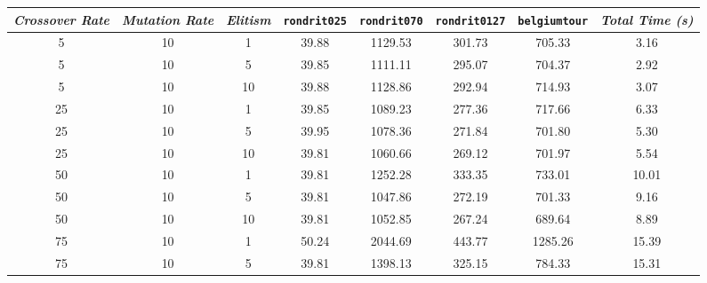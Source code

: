 

\begin{table}[H]
\centering
\footnotesize
{\renewcommand{\arraystretch}{1}}
\begin{tabular}{ccc|c|c|c|c|c}
\textit{Crossover Rate} & \textit{Mutation Rate} & \textit{Elitism} & \texttt{rondrit025} & \texttt{rondrit070} & \texttt{rondrit0127} & \texttt{belgiumtour} & \textit{Total Time (s)} \\\hline
5 & 10 & 1 & \cellcolor{gray!50}39.88 & \cellcolor{gray!1}1129.53 & \cellcolor{gray!1}301.73 & \cellcolor{gray!37}705.33 & 3.16\\
5 & 10 & 5 & \cellcolor{gray!50}39.85 & \cellcolor{gray!1}1111.11 & \cellcolor{gray!1}295.07 & \cellcolor{gray!37}704.37 & 2.92\\
5 & 10 & 10 & \cellcolor{gray!50}39.88 & \cellcolor{gray!1}1128.86 & \cellcolor{gray!1}292.94 & \cellcolor{gray!34}714.93 & 3.07\\
25 & 10 & 1 & \cellcolor{gray!50}39.85 & \cellcolor{gray!1}1089.23 & \cellcolor{gray!1}277.36 & \cellcolor{gray!33}717.66 & 6.33\\
25 & 10 & 5 & \cellcolor{gray!49}39.95 & \cellcolor{gray!1}1078.36 & \cellcolor{gray!1}271.84 & \cellcolor{gray!38}701.80 & 5.30\\
25 & 10 & 10 & \cellcolor{gray!50}39.81 & \cellcolor{gray!1}1060.66 & \cellcolor{gray!1}269.12 & \cellcolor{gray!38}701.97 & 5.54\\
50 & 10 & 1 & \cellcolor{gray!50}39.81 & \cellcolor{gray!1}1252.28 & \cellcolor{gray!1}333.35 & \cellcolor{gray!28}733.01 & 10.01\\
50 & 10 & 5 & \cellcolor{gray!50}39.81 & \cellcolor{gray!1}1047.86 & \cellcolor{gray!1}272.19 & \cellcolor{gray!38}701.33 & 9.16\\
50 & 10 & 10 & \cellcolor{gray!50}39.81 & \cellcolor{gray!1}1052.85 & \cellcolor{gray!1}267.24 & \cellcolor{gray!41}689.64 & 8.89\\
75 & 10 & 1 & \cellcolor{gray!1}50.24 & \cellcolor{gray!1}2044.69 & \cellcolor{gray!1}443.77 & \cellcolor{gray!1}1285.26 & 15.39\\
75 & 10 & 5 & \cellcolor{gray!50}39.81 & \cellcolor{gray!1}1398.13 & \cellcolor{gray!1}325.15 & \cellcolor{gray!12}784.33 & 15.31\\

\end{tabular}
\end{table}
